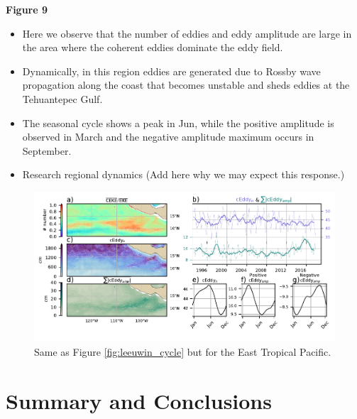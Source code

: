 \documentclass[draft,linenumbers]{agujournal2019}
\begin{document}
	\textbf{Figure 9}
	\begin{itemize}
		\item Here we observe that the number of eddies and eddy amplitude are large in the area where the coherent eddies dominate the eddy field.
		\item Dynamically, in this region eddies are generated due to Rossby wave propagation along the coast that becomes unstable and sheds eddies at the Tehuantepec Gulf.
		\item The seasonal cycle shows a peak in Jun, while the positive amplitude is observed in March and the negative amplitude maximum occurs in September. 
		\item Research regional dynamics (Add here why we may expect this response.)
	\end{itemize}

	\begin{figure}
	    \centering
	    \includegraphics[width=1\textwidth]{figures/regional_ratios_and_stats_V3_3.pdf}
	    \caption{Same as Figure \ref{fig:leeuwin_cycle} but for the East Tropical Pacific.}
	    \label{fig:south_atlantic_cycle}
	\end{figure}
	
	\section{Summary and Conclusions}	
	\label{sec:Conclusions}
	
	\acknowledgments
	
	
	
\end{document}
